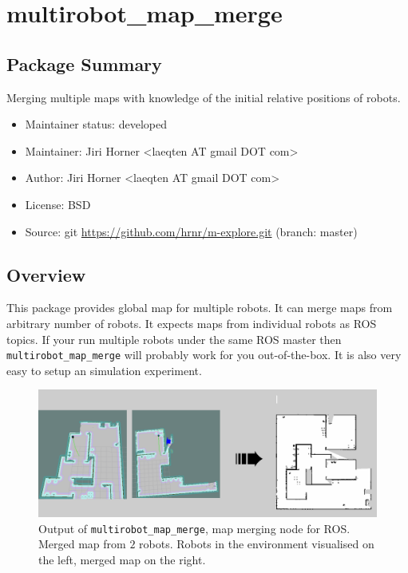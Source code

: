 \chapter{multirobot\_map\_merge}
\label{chap:map_merge-doc}

\section{Package Summary}

Merging multiple maps with knowledge of the initial relative positions of robots.

\begin{itemize}
    \item Maintainer status: developed
    \item Maintainer: Jiri Horner \textless laeqten AT gmail DOT com\textgreater
    \item Author: Jiri Horner \textless laeqten AT gmail DOT com\textgreater
    \item License: BSD
    \item Source: git \url{https://github.com/hrnr/m-explore.git} (branch: master)
\end{itemize}

\section{Overview}

This package provides global map for multiple robots. It can merge maps from arbitrary number of robots. It expects maps from individual robots as ROS topics. If your run multiple robots under the same ROS master then \texttt{multirobot\_map\_merge} will probably work for you out-of-the-box. It is also very easy to setup an simulation experiment.

\begin{figure}
    \centering
    \includegraphics[width=4.53in]{../img/map_merge_cover.png}
    \caption{Output of \texttt{multirobot\_map\_merge}, map merging node for \gls{ROS}. Merged map from $2$ robots. Robots in the environment visualised on the left, merged map on the right.}
    \label{fig:mapmergecover}
\end{figure}

